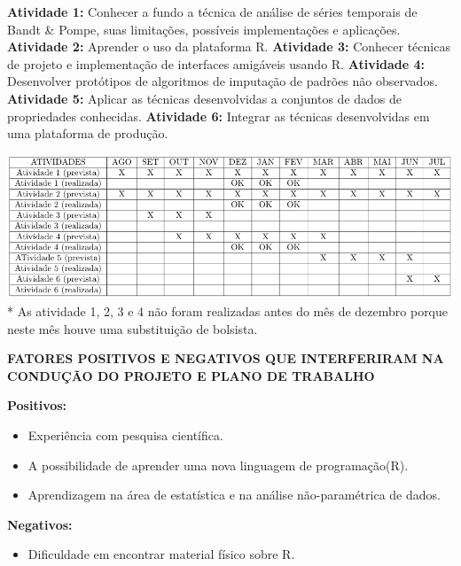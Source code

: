 \documentclass{article}
\begin{document}
\begin{flushleft}    
\textbf{Atividade 1:} Conhecer a fundo a técnica de análise de séries temporais de Bandt \& Pompe, suas limitações, possíveis implementações e aplicações.
\newline
\textbf{Atividade 2:} Aprender o uso da plataforma R.
\newline
\textbf{Atividade 3:} Conhecer técnicas de projeto e implementação de interfaces amigáveis usando R.
\newline
\textbf{Atividade 4:} Desenvolver protótipos de algoritmos de imputação de padrões não observados.
\newline
\textbf{Atividade 5:} Aplicar as técnicas desenvolvidas a conjuntos de dados de propriedades conhecidas.
\newline
\textbf{Atividade 6:} Integrar as técnicas desenvolvidas em uma plataforma de produção.
\end{flushleft}
\includegraphics[width=1.1\columnwidth]{tabela}
* As atividade 1, 2, 3 e 4 não foram realizadas antes do mês de dezembro porque neste mês houve uma substituição de bolsista.

\newpage
\begin{center}
\textbf{\large{FATORES POSITIVOS E NEGATIVOS QUE INTERFERIRAM NA CONDUÇÃO DO PROJETO E PLANO DE TRABALHO}}

\hrulefill 

\end{center}
\textbf{Positivos:}
\begin{itemize}
    \item Experiência com pesquisa científica.
    \item A possibilidade de aprender uma nova linguagem de programação(R).
    \item Aprendizagem na área de estatística e na análise não-paramétrica de dados.
\end{itemize}
\textbf{Negativos:}
\begin{itemize}
    \item Dificuldade em encontrar material físico sobre R.
\end{itemize}

\newpage


\end{document}
